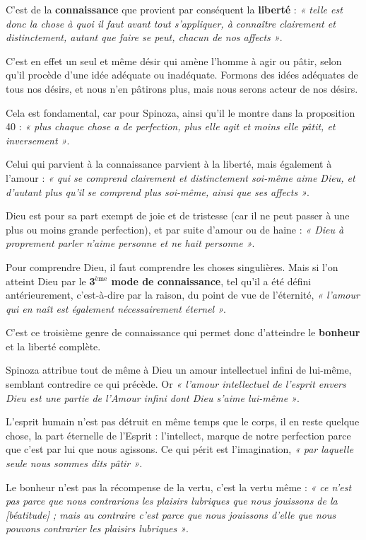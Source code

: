\vspace{0.5cm}
C’est de la {\bf connaissance} que provient par conséquent la {\bf liberté} : {\it « telle est
donc la chose à quoi il faut avant tout s’appliquer, à connaître clairement et
distinctement, autant que faire se peut, chacun de nos affects »}.

C’est en effet un seul et même désir qui amène l’homme à agir ou pâtir, selon
qu’il procède d’une idée adéquate ou inadéquate. Formons des idées adéquates
de tous nos désirs, et nous n’en pâtirons plus, mais nous serons acteur de nos
désirs.

Cela est fondamental, car pour Spinoza, ainsi qu’il le montre dans la
proposition 40 : {\it « plus chaque chose a de perfection, plus elle agit et moins
elle pâtit, et inversement »}.

Celui qui parvient à la connaissance parvient à la liberté, mais également à
l’amour : {\it « qui se comprend clairement et distinctement soi-même aime Dieu, et
d’autant plus qu’il se comprend plus soi-même, ainsi que ses affects »}.

\vspace{0.5cm}
Dieu est pour sa part exempt de joie et de tristesse (car il ne peut passer à
une plus ou moins grande perfection), et par suite d’amour ou de haine : {\it « Dieu
à proprement parler n’aime personne et ne hait personne »}.

Pour comprendre Dieu, il faut comprendre les choses singulières. Mais si l’on
atteint Dieu par le {\bf 3$^\text{ème}$ mode de connaissance}, tel qu’il a été défini
antérieurement, c’est-à-dire par la raison, du point de vue de l’éternité,
{\it « l’amour qui en naît est également nécessairement éternel »}.

C’est ce troisième genre de connaissance qui permet donc d’atteindre le
{\bf bonheur} et la liberté complète.

Spinoza attribue tout de même à Dieu un amour intellectuel infini de lui-même,
semblant contredire ce qui précède. Or {\it « l’amour intellectuel de l’esprit envers
Dieu est une partie de l’Amour infini dont Dieu s’aime lui-même »}.

L’esprit humain n’est pas détruit en même temps que le corps, il en reste
quelque chose, la part éternelle de l’Esprit : l’intellect, marque de notre
perfection parce que c’est par lui que nous agissons. Ce qui périt est
l’imagination, {\it « par laquelle seule nous sommes dits pâtir »}.

Le bonheur n’est pas la récompense de la vertu, c’est la vertu même : {\it « ce n’est
pas parce que nous contrarions les plaisirs lubriques que nous jouissons de la
[{\it béatitude}] ; mais au contraire c’est parce que nous jouissons d’elle que nous
pouvons contrarier les plaisirs lubriques »}.

